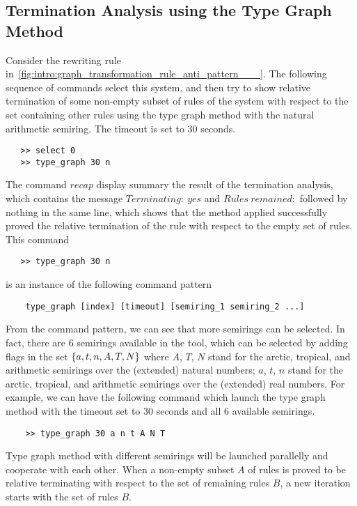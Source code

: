 \subsection{Termination Analysis using the Type Graph Method}
Consider the rewriting rule in~\autoref{fig:intro:graph_transformation_rule_anti_pattern___}.
The following sequence of commands select this system, and then try to show relative termination of some non-empty subset of rules of the system with respect to the set containing other rules using the type graph method with the natural arithmetic semiring. The timeout is set to 30 seconds.
 \begin{verbatim}
   >> select 0
   >> type_graph 30 n
\end{verbatim}
The command \colorbox{Ivory2}{$recap$} display summary the result of the termination analysis, which contains the message \colorbox{Ivory2}{$Terminating:\ yes$} and \colorbox{Ivory2}{$Rules\ remained:$} followed by nothing in the same line, which shows that the method applied successfully proved the relative termination of the rule with respect to the empty set of rules.
This command
\begin{verbatim}
   >> type_graph 30 n
\end{verbatim}
is an instance of the following command pattern
\begin{verbatim}
    type_graph [index] [timeout] [semiring_1 semiring_2 ...]
\end{verbatim}
From the command pattern, we can see that more semirings can be selected. In fact, there are 6 semirings available in the tool, which can be selected by adding flags in the set $\{a,t,n,A,T,N\}$
where $A$, $T$, $N$ stand for the arctic, tropical, and arithmetic semirings over the (extended) natural numbers;  $a$, $t$, $n$ stand for the arctic, tropical, and arithmetic semirings over the (extended) real numbers. For example, we can have the following command which launch the type graph method with the timeout set to 30 seconds and all 6 available semirings.
\begin{verbatim}
    >> type_graph 30 a n t A N T
\end{verbatim}
Type graph method with different semirings will be launched parallelly and cooperate with each other. When a non-empty subset $A$ of rules is proved to be relative terminating with respect to the set of remaining rules $B$, a new iteration starts with the set of rules $B$.











